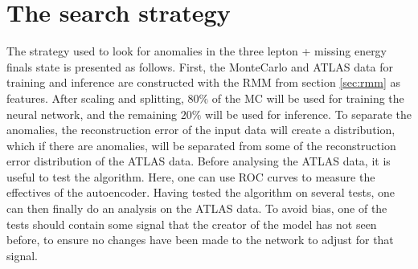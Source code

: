 \section{The search strategy}
The strategy used to look for anomalies in the three lepton + missing energy finals state is presented as follows. First, the MonteCarlo and ATLAS data 
for training and inference are constructed with the RMM from section \ref{sec:rmm} as features. After scaling and splitting, $80\%$ of the MC will be used for 
training the neural network, and the remaining $20\%$ will be used for inference. To separate the anomalies, the reconstruction error of the input data 
will create a distribution, which if there are anomalies, will be separated from some of the reconstruction error distribution of the ATLAS data. 
Before analysing the ATLAS data, it is useful to test the algorithm. Here, one can use ROC curves to measure the effectives of the autoencoder. 
Having tested the algorithm on several tests, one can then finally do an analysis on
the ATLAS data. To avoid bias, one of the tests should contain some signal that the creator of the model has not seen before, to ensure no changes have been made 
to the network to adjust for that signal. 